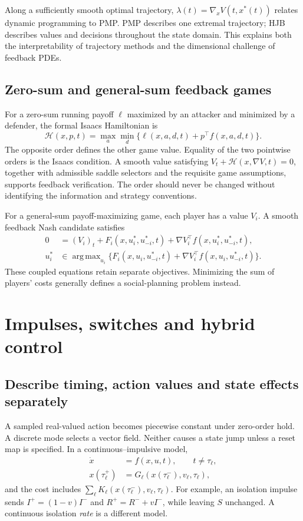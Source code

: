 \documentclass[11pt,a4paper]{article}
\DeclareMathOperator*{\argmax}{arg\,max}
\theoremstyle{definition}
\theoremstyle{remark}
\begin{document}
Along a sufficiently smooth optimal trajectory, $\lambda(t)=\nabla_xV(t,x^*(t))$ relates dynamic programming to PMP. PMP describes one extremal trajectory; HJB describes values and decisions throughout the state domain. This explains both the interpretability of trajectory methods and the dimensional challenge of feedback PDEs.

\subsection{Zero-sum and general-sum feedback games}
For a zero-sum running payoff $\ell$ maximized by an attacker and minimized by a defender, the formal Isaacs Hamiltonian is
\begin{equation}
\mathcal H(x,p,t)=\max_a\min_d\{\ell(x,a,d,t)+p^\top f(x,a,d,t)\}.
\end{equation}
The opposite order defines the other game value. Equality of the two pointwise orders is the Isaacs condition. A smooth value satisfying $V_t+\mathcal H(x,\nabla V,t)=0$, together with admissible saddle selectors and the requisite game assumptions, supports feedback verification. The order should never be changed without identifying the information and strategy conventions.

For a general-sum payoff-maximizing game, each player has a value $V_i$. A smooth feedback Nash candidate satisfies
\begin{align}
0&=(V_i)_t+F_i(x,u_i^*,u_{-i}^*,t)+\nabla V_i^\top f(x,u_i^*,u_{-i}^*,t),\nonumber\\
u_i^*&\in\argmax_{u_i}\{F_i(x,u_i,u_{-i}^*,t)+\nabla V_i^\top f(x,u_i,u_{-i}^*,t)\}.
\end{align}
These coupled equations retain separate objectives. Minimizing the sum of players' costs generally defines a social-planning problem instead.

\section{Impulses, switches and hybrid control}
\subsection{Describe timing, action values and state effects separately}
A sampled real-valued action becomes piecewise constant under zero-order hold. A discrete mode selects a vector field. Neither causes a state jump unless a reset map is specified. In a continuous--impulsive model,
\begin{align}
\dot x&=f(x,u,t),\qquad t\ne\tau_\ell,\nonumber\\
x(\tau_\ell^+)&=G_\ell(x(\tau_\ell^-),v_\ell,\tau_\ell),\label{eq:reset}\end{align}
and the cost includes $\sum_\ell K_\ell(x(\tau_\ell^-),v_\ell,\tau_\ell)$.
For example, an isolation impulse sends $I^+=(1-v)I^-$ and $R^+=R^-+vI^-$, while leaving $S$ unchanged. A continuous isolation \emph{rate} is a different model.
\end{document}
